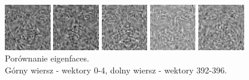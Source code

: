 \documentclass{article}
\begin{document}
\begin{figure}
	\begin{minipage}{2cm}
		\includegraphics[width=2cm]{392.jpg}
	\end{minipage}
	\begin{minipage}{2cm}
		\includegraphics[width=2cm]{393.jpg}
	\end{minipage}
	\begin{minipage}{2cm}
		\includegraphics[width=2cm]{394.jpg}
	\end{minipage}
	\begin{minipage}{2cm}
		\includegraphics[width=2cm]{395.jpg}
	\end{minipage}
	\begin{minipage}{2cm}
		\includegraphics[width=2cm]{396.jpg}
	\end{minipage}
	
	\caption{Porównanie eigenfaces. \\ Górny wiersz - wektory 0-4, dolny wiersz - wektory 392-396.}
	\label{fig:eigenfaces}
\end{figure}
\end{document}
